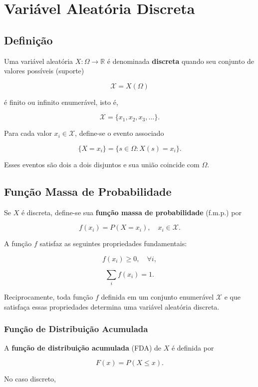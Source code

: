 \newpage
\section{Variável Aleatória Discreta}
\subsection*{Definição}

Uma variável aleatória $X:\Omega \to \mathbb{R}$ é denominada
\textbf{discreta} quando seu conjunto de valores possíveis (suporte)

\[
\mathcal{X} = X(\Omega)
\]

é finito ou infinito enumerável, isto é,

\[
\mathcal{X} = \{x_1, x_2, x_3, \dots\}.
\]

Para cada valor $x_i \in \mathcal{X}$, define-se o evento associado

\[
\{X=x_i\} = \{s \in \Omega : X(s)=x_i\}.
\]

Esses eventos são dois a dois disjuntos e sua união coincide com $\Omega$.

\subsection{Função Massa de Probabilidade}

Se $X$ é discreta, define-se sua
\textbf{função massa de probabilidade} (f.m.p.) por

\[
f(x_i)=P(X=x_i),
\quad x_i \in \mathcal{X}.
\]

A função $f$ satisfaz as seguintes propriedades fundamentais:

\[
f(x_i) \ge 0, \quad \forall i,
\]

\[
\sum_{i} f(x_i)=1.
\]

Reciprocamente, toda função $f$ definida em um conjunto enumerável
$\mathcal{X}$ e que satisfaça essas propriedades determina uma variável aleatória discreta.

\subsubsection{Função de Distribuição Acumulada}

A \textbf{função de distribuição acumulada} (FDA) de $X$ é definida por

\[
F(x)=P(X\leq x).
\]

No caso discreto,

